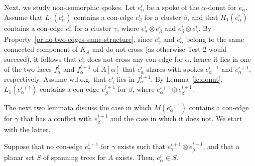 \documentclass[letter,runningheads]{llncs}
\newcommand{\conf}{\otimes}
\begin{document}
Next, we study non-isomorphic spokes. Let $e^i_\alpha$ be a spoke of the $\alpha$-donut for $e_{\alpha}$. Assume that $L_1(e^i_\alpha)$ contains a con-edge $e^i_{\beta}$ for a cluster $\beta$, and that $H_1(e^i_\alpha)$ contains a con-edge $e^i_{\gamma}$ for a cluster $\gamma$, where $e^i_\alpha\conf e^i_{\beta}$ and $e^i_{\beta} \conf e^i_{\gamma}$. By Property~\ref{pr:no-two-edges-same-structure}, since $e^i_\gamma$ and $e^i_\alpha$ belong to the same connected component of $K_A$ and do not cross (as otherwise {\sc Test 2} would succeed), it follows that $e^i_\gamma$ does not cross any con-edge for $\alpha$, hence it lies in one of the two faces $f^{i}_\alpha$ and $f^{i+1}_\alpha$ of $A[\alpha]$ that $e^i_\alpha$ shares with spokes $e^{i-1}_\alpha$ and $e^{i+1}_\alpha$, respectively. Assume w.l.o.g. that $e^i_\gamma$ lies in $f^{i+1}_\alpha$. By Lemma~\ref{le:donut}, $L_1(e^{i+1}_\alpha)$ contains a con-edge $e^{i+1}_{\beta}$ for $\beta$, where $e^{i+1}_\alpha\conf e^{i+1}_{\beta}$.

The next two lemmata discuss the case in which $M(e^{i+1}_\alpha)$ contains a con-edge for $\gamma$ that has a conflict with $e^{i+1}_{\beta}$ and the case in which it does not. We start with the latter.

\begin{lemma}[{\sc Simplification 6}] \label{le:non-isomorphic-differentT1}
Suppose that no con-edge $e^{i+1}_{\gamma}$ for $\gamma$ exists such that $e^{i+1}_{\gamma} \conf e^{i+1}_{\beta}$, and that a planar set $S$ of spanning trees for $A$ exists. Then, $e^i_\alpha\in S$.
\end{lemma}
\end{document}
